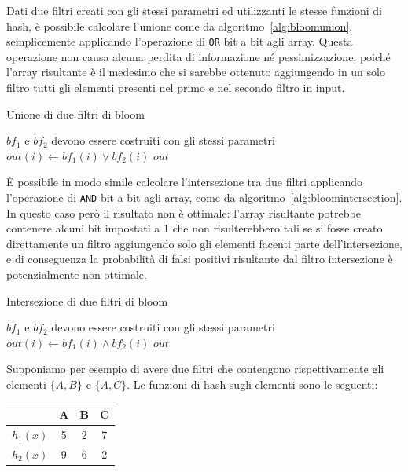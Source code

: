 Dati due filtri creati con gli stessi parametri ed utilizzanti le stesse funzioni di hash, è
possibile calcolare l'unione come da algoritmo~\ref{alg:bloomunion}, semplicemente applicando
l'operazione di \verb|OR| bit a bit agli array. Questa operazione non causa alcuna perdita di
informazione né pessimizzazione, poiché l'array risultante è il medesimo che si sarebbe ottenuto
aggiungendo in un solo filtro tutti gli elementi presenti nel primo e nel secondo filtro in input.

\begin{algorithm}
\caption{Unione di due filtri di bloom}
\label{alg:bloomunion}
\begin{algorithmic}[1]
\Require $bf_1$ e $bf_2$ devono essere costruiti con gli stessi parametri
		\State $out(i) \gets bf_1(i) \lor bf_2(i)$
	\EndFor
	\State \Return $out$
\EndProcedure
\end{algorithmic}
\end{algorithm}


È possibile in modo simile calcolare l'intersezione tra due filtri applicando l'operazione di
\verb|AND| bit a bit agli array, come da algoritmo~\ref{alg:bloomintersection}. In questo caso però
il risultato non è ottimale: l'array risultante potrebbe contenere alcuni bit impostati a 1 che non
risulterebbero tali se si fosse creato direttamente un filtro aggiungendo solo gli elementi facenti
parte dell'intersezione, e di conseguenza la probabilità di falsi positivi risultante dal filtro
intersezione è potenzialmente non ottimale.

\begin{algorithm}
\caption{Intersezione di due filtri di bloom}
\label{alg:bloomintersection}
\begin{algorithmic}[1]
\Require $bf_1$ e $bf_2$ devono essere costruiti con gli stessi parametri
		\State $out(i) \gets bf_1(i) \land bf_2(i)$
	\EndFor
	\State \Return $out$
\EndProcedure
\end{algorithmic}
\end{algorithm}

Supponiamo per esempio di avere due filtri che contengono rispettivamente gli elementi $\{ A, B \}$
e $\{ A, C \}$. Le funzioni di hash sugli elementi sono le seguenti:

\begin{center}
	\begin{tabular}{ l c c c }
		 & A & B & C \\
		\hline
		$h_1(x)$ & 5 & 2 & 7 \\
		$h_2(x)$ & 9 & 6 & 2 \\	
		\hline
	\end{tabular}
\end{center}

